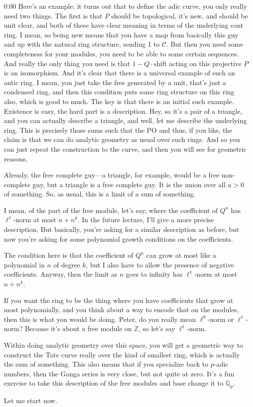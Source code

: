 \begin{unfinished}{0:00}
Here's an example: it turns out that to define the adic curve, you only really need two things. The first is that $P$ should be topological, it's new, and should be unit clear, and both of these have clear meaning in terms of the underlying cont ring. I mean, so being new means that you have a map from basically this guy and up with the natural ring structure, sending 1 to $\mathcal{C}$. But then you need some completeness for your modules, you need to be able to some certain sequences. And really the only thing you need is that $1 - Q \cdot \text{shift}$ acting on this projective $P$ is an isomorphism. And it's clear that there is a universal example of such an antic ring. I mean, you just take the free generated by a unit, that's just a condensed ring, and then this condition puts some ring structure on this ring also, which is good to much. The key is that there is an initial such example. Existence is easy, the hard part is a description. Hey, so it's a pair of a triangle, and you can actually describe a triangle, and well, let me describe the underlying ring. This is precisely those sums such that the PO and thus, if you like, the claim is that we can do analytic geometry as usual over such rings. And so you can just repeat the construction to the curve, and then you will see for geometric reasons,

Already, the free complete guy---a triangle, for example, would be a free non-complete guy, but a triangle is a free complete guy. It is the union over all $a > 0$ of something. So, as usual, this is a limit of a sum of something. 

I mean, of the part of the free module, let's say, where the coefficient of $Q^n$ has $\ell^1$-norm at most $n + n^k$. In the future lecture, I'll give a more precise description. But basically, you're asking for a similar description as before, but now you're asking for some polynomial growth conditions on the coefficients.

The condition here is that the coefficient of $Q^n$ can grow at most like a polynomial in $n$ of degree $k$, but I also have to allow the presence of negative coefficients. Anyway, then the limit as $n$ goes to infinity has $\ell^1$-norm at most $n + n^k$.

If you want the ring to be the thing where you have coefficients that grow at most polynomially, and you think about a way to encode that on the modules, then this is what you would be doing. Peter, do you really mean $\ell^0$-norm or $\ell^1$-norm? Because it's about a free module on $\mathbb{Z}$, so let's say $\ell^1$-norm.

Within doing analytic geometry over this space, you will get a geometric way to construct the Tate curve really over the kind of smallest ring, which is actually the sum of something. This also means that if you specialize back to $p$-adic numbers, then the Ganga series is very close, but not quite at zero. It's a fun exercise to take this description of the free modules and base change it to $\mathbb{Q}_p$.

Let me start now.

\end{unfinished}
